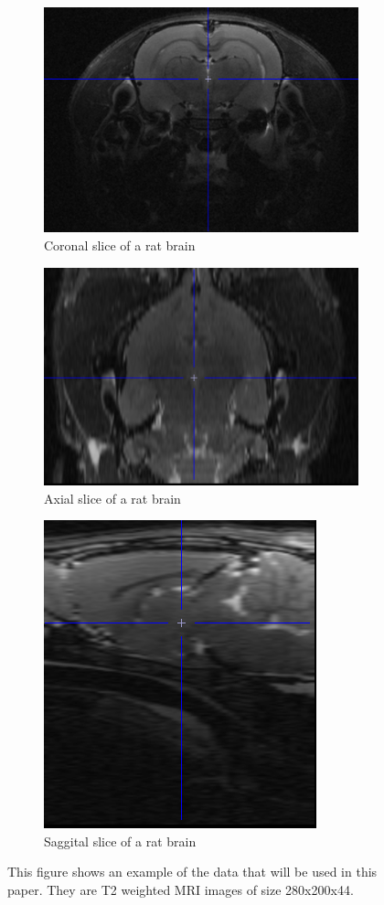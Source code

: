 \begin{figure}
\centering
\begin{subfigure}{.5\textwidth}
  \centering
  \includegraphics[width=.6\linewidth]{coronal_brain_view.png}
  \caption{Coronal slice of a rat brain}
  \label{fig:coronal}
\end{subfigure}%
\begin{subfigure}{.5\textwidth}
  \centering
  \includegraphics[width=.6\linewidth]{axial_brain_view.png}
  \caption{Axial slice of a rat brain}
  \label{fig:axial}
\end{subfigure}
\begin{subfigure}{.3\textwidth}
  \centering
  \includegraphics[width=.6\linewidth]{sagittal_brain_view.png}
  \caption{Saggital slice of a rat brain}
  \label{fig:saggital}
\end{subfigure}

\caption{This figure shows an example of the data that will be used in this paper. They are T2 weighted MRI images of size 280x200x44. }
\label{fig:MRI image}
\end{figure}

